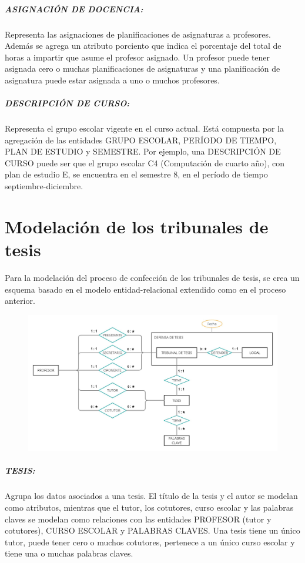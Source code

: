 \subparagraph{ASIGNACIÓN DE DOCENCIA:}
Representa las asignaciones de planificaciones de asignaturas a profesores.
Además se agrega un atributo porciento que indica el porcentaje del total de horas 
a impartir que asume el profesor asignado. Un profesor puede 
tener asignada cero o muchas planificaciones de asignaturas y una planificación de 
asignatura puede estar asignada a uno o muchos profesores.


\subparagraph{DESCRIPCIÓN DE CURSO:}
Representa el grupo escolar vigente en el curso actual. Está 
compuesta por la agregación de las entidades GRUPO ESCOLAR,
PERÍODO DE TIEMPO, PLAN DE ESTUDIO y SEMESTRE.  
Por ejemplo, una DESCRIPCIÓN DE CURSO puede ser 
que el grupo escolar C4 (Computación de cuarto año), con plan de
estudio E, se encuentra en el semestre 8,  en el período de tiempo septiembre-diciembre.






\section{Modelación de los tribunales de tesis}\label{database:planificación-tesis}
Para la modelación del proceso de confección de los tribunales de tesis,
se crea un esquema basado en el modelo entidad-relacional extendido como en el 
proceso anterior. 


\begin{figure}[H]
    \includegraphics[scale=0.22]{Graphics/Database/MERXX-TC-FINAL.png}
    \caption{}
    \label{mern-ta}
\end{figure}


\subparagraph{TESIS:}
Agrupa los datos asociados a una tesis.
El título de la tesis y el autor se modelan como atributos, mientras que
el tutor, los cotutores, curso escolar y las palabras claves se modelan como relaciones con 
las entidades PROFESOR (tutor y cotutores), CURSO ESCOLAR y PALABRAS CLAVES.
Una tesis tiene un único tutor, puede tener cero o muchos cotutores, pertenece a 
un único curso escolar y tiene una o muchas palabras claves. 

